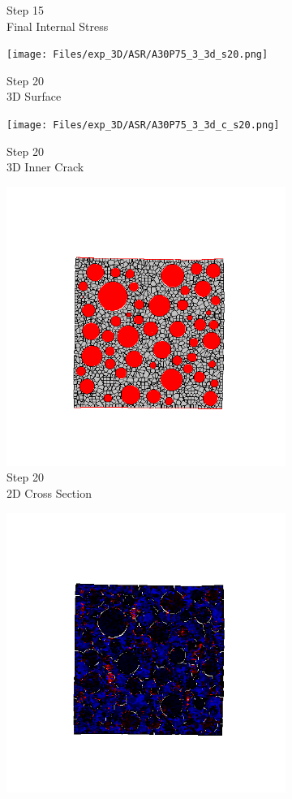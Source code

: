 \begin{figure}[ht!]
\begin{subfigure}{.25\textwidth}
      \caption{Step 15\\Final Internal Stress}
    \end{subfigure}
    \begin{subfigure}{.25\textwidth}
      \centering
      \texttt{[image: Files/exp\_3D/ASR/A30P75\_3\_3d\_s20.png]}
      \caption{Step 20\\3D Surface}
    \end{subfigure}%
    \begin{subfigure}{.25\textwidth}
      \centering
      \texttt{[image: Files/exp\_3D/ASR/A30P75\_3\_3d\_c\_s20.png]}
      \caption{Step 20\\3D Inner Crack}
    \end{subfigure}%
    \begin{subfigure}{.25\textwidth}
      \centering
      \includegraphics[width=.8\linewidth]{Files/exp_3D/ASR/A30P75_3_crack.png}
      \caption{Step 20\\2D Cross Section}
    \end{subfigure}%
    \begin{subfigure}{.25\textwidth}
      \centering
      \includegraphics[width=.8\linewidth]{Files/exp_3D/ASR/A30P75_3_stress.png}

\end{subfigure}
\end{figure}
